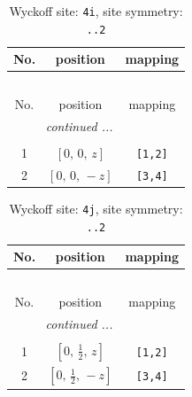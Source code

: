 \documentclass[fleqn,8pt]{jsarticle}
\begin{document}
\renewcommand{\arraystretch}{1.2}
\begin{longtable}{ccc}
\caption{Wyckoff site: {\tt 4i}, site symmetry: {\tt ..2}}
 \\
 \hline \hline
No. & position & mapping \\ \hline \endfirsthead

\multicolumn{2}{l}{\tablename\ \thetable{}} \\
 \hline \hline
No. & position & mapping \\ \hline \endhead

 \hline \hline
\multicolumn{2}{r}{\footnotesize\it continued ...} \\ \endfoot

 \hline \hline
\multicolumn{2}{r}{} \\ \endlastfoot

1 & $\left[ 0,\, 0,\, z \right]$ & {\tt [1,2]} \\ \hline
2 & $\left[ 0,\, 0,\, - z \right]$ & {\tt [3,4]} \\
\end{longtable}
\renewcommand{\arraystretch}{1.2}
\begin{longtable}{ccc}
\caption{Wyckoff site: {\tt 4j}, site symmetry: {\tt ..2}}
 \\
 \hline \hline
No. & position & mapping \\ \hline \endfirsthead

\multicolumn{2}{l}{\tablename\ \thetable{}} \\
 \hline \hline
No. & position & mapping \\ \hline \endhead

 \hline \hline
\multicolumn{2}{r}{\footnotesize\it continued ...} \\ \endfoot

 \hline \hline
\multicolumn{2}{r}{} \\ \endlastfoot

1 & $\left[ 0,\, \frac{1}{2},\, z \right]$ & {\tt [1,2]} \\ \hline
2 & $\left[ 0,\, \frac{1}{2},\, - z \right]$ & {\tt [3,4]} \\
\end{longtable}
\renewcommand{\arraystretch}{1.2}
\end{document}
